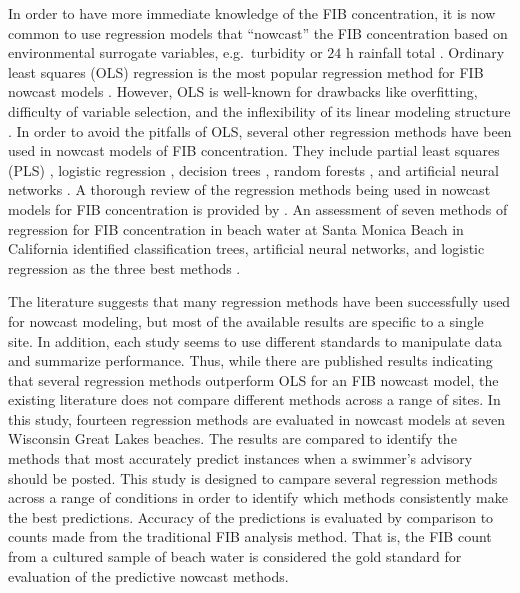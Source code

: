 \documentclass[authoryear,review, 12pt]{elsarticle}
\begin{document}
In order to have more immediate knowledge of the FIB concentration, it
is now common to use regression models that ``nowcast'' the FIB
concentration based on environmental surrogate variables,
e.g.~turbidity or $24$ h rainfall total \citep{Brandt:2006gj,Olyphant:2004yq}. Ordinary least squares (OLS) regression is the most popular
regression method for FIB nowcast models
\citep{Nevers:2005ln,Francy:2007yv,deBrauwere-Koffi-Servais-2014}. However, OLS is well-known for
drawbacks like overfitting, difficulty of variable selection, and the
inflexibility of its linear modeling structure \citep{Ge:2007ou}. 
In order to avoid the pitfalls of OLS, several other regression methods have been used in
 nowcast models of FIB concentration. They include 
partial least squares (PLS) \citep{Hou:2006nf,Brooks-Fienen-Corsi-2013}, logistic regression \citep{Waschbusch:2004bd,Jin:2006tr}, decision trees \citep{Stidson-2012}, random forests
\citep{Parkhurst:2005zf,Jones-Liu-Dorovitch-2012}, and artificial
neural networks \citep{Kashefipour-Lin-Falconer-2005,He:2008jx}. A
thorough review of the regression methods being used in nowcast
models for FIB concentration is provided by
\cite{deBrauwere-Koffi-Servais-2014}. An assessment of seven methods of
regression for FIB concentration in beach water at Santa Monica Beach in
California identified classification trees, artificial neural networks,
and logistic regression as the three best methods
\citep{Thoe-Gold-Griesbach-Grimmer-Taggart-Boehm-2014}.

The literature suggests that many regression methods have been
successfully used for nowcast modeling, but most of the available results are 
specific to a single site. In addition, each study seems to use different standards to manipulate data and summarize performance. Thus, while there are published results indicating that several regression methods outperform OLS for an FIB nowcast model, the existing literature does not compare different methods across a range of sites. In this
study, fourteen regression methods are evaluated in nowcast models at
seven Wisconsin Great Lakes beaches. The results
are compared to identify the methods that most accurately predict
instances when a swimmer's advisory should be posted. This study is designed to 
campare several regression methods across a range of conditions in order to identify which 
methods consistently make the best predictions. Accuracy of the predictions is evaluated by comparison to counts made from the traditional FIB analysis method. That is, the FIB count from a cultured sample of beach water is considered the gold standard for evaluation of the predictive nowcast methods.
\end{document}
